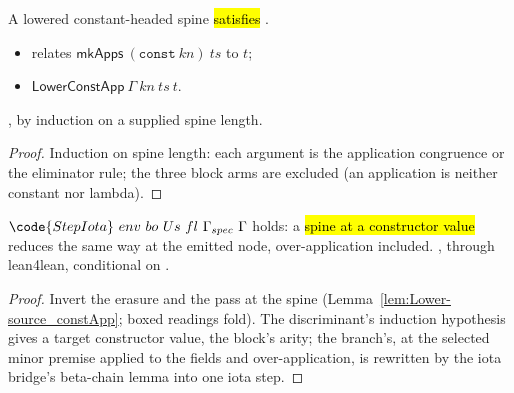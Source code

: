 \begin{lemma}
\label{lem:Lower-source_constApp}
\leanok
{}
 A lowered constant-headed spine \hl{satisfies }.
\begin{itemize}
\item {} \Lower{} relates $\mathsf{mkApps}\ (\mathtt{const}\ kn)\ ts$ to $t$;
\item {} $\mathsf{LowerConstApp}\ \Gamma\ kn\ ts\ t$.
\end{itemize}
 , by induction on a supplied spine length.
\end{lemma}
\begin{proof}
\leanok
{}
 Induction on spine length: each argument is the application congruence or the eliminator
rule; the three block arms are excluded (an application is neither constant nor lambda).
\end{proof}

\begin{theorem}
\label{thm:step_iota}
\leanok
{}
 $\code{StepIota}\ env\ bo\ Us\ fl\ \Gamma_{spec}\ \Gamma$ holds: a \hl{
spine at a constructor value} reduces the same way at the emitted  node, over-application
included.
 \stProved{}, \stInherited{} through lean4lean, conditional on \stAssumed{}
.
\end{theorem}
\begin{proof}
\leanok
{}
 Invert the erasure and the pass at the spine (Lemma~\ref{lem:Lower-source_constApp}; boxed
readings fold). The discriminant's induction hypothesis gives a target constructor value, \LowerEnv{}
the block's arity; the branch's, at the selected minor premise applied to the fields and
over-application, is rewritten by the iota bridge's beta-chain lemma into one iota step.
\end{proof}

